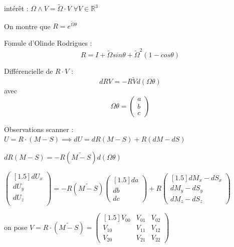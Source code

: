 \documentclass[french]{report}
\begin{document}
\vspace{0.3cm}

intérêt : $\Omega \wedge V = \tilde{\Omega} \cdot V$ \quad $\forall V \in \mathbb{R}^3$

\vspace{0.3cm}

On montre que $R = e^{\tilde{\Omega}\theta}$

\vspace{0.3cm}

Fomule d'Olinde Rodrigues : $$R = I + \tilde{\Omega}sin\theta +  {\tilde{\Omega}}^2(1-cos\theta)$$

\vspace{0.3cm}
Différencielle de $R \cdot V$ : $$dRV = -R\tilde{V}d(\Omega\theta)$$ avec $$\Omega\theta = \begin{pmatrix} a \\ b \\ c \end{pmatrix}$$

\vspace{0.3cm}
Observations scanner : $U=R \cdot (M - S) \implies dU = dR(M-S) +R(dM-dS)$

\vspace{0.3cm}
$dR(M-S) = -R(\widetilde{M-S})d(\Omega\theta)$

\vspace{0.3cm}
$\begin{pmatrix}[1.5] dU_x \\ dU_y \\ dU_z \\ \end{pmatrix} =
-R(\widetilde{M-S}) \begin{pmatrix}[1.5] da \\ db \\ dc \end{pmatrix} +
R \begin{pmatrix}[1.5] dM_x-dS_x \\ dM_y-dS_y \\ dM_z-dS_z \end{pmatrix}$

\vspace{0.3cm}
on pose $V=R\cdot(\widetilde{M-S})=\begin{pmatrix}[1.5] V_{00} & V_{01} & V_{02} \\ V_{10} & V_{11} & V_{12} \\ V_{20} & V_{21} & V_{22} \end{pmatrix}$
\end{document}

